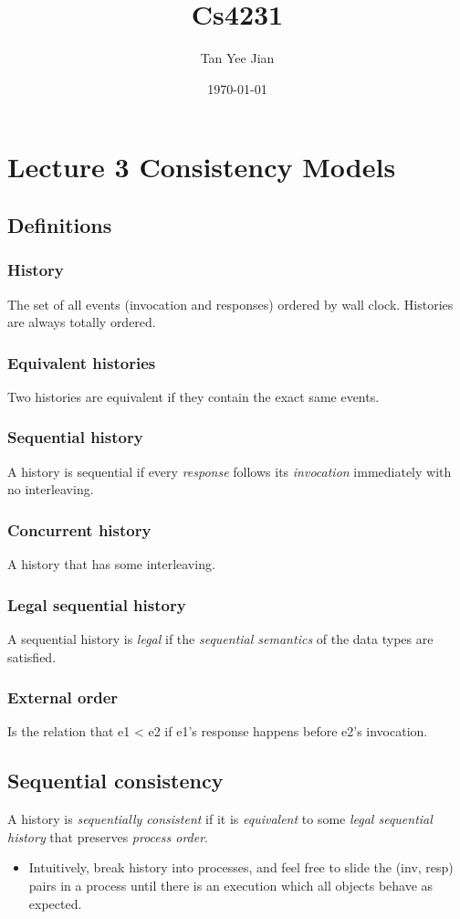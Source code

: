 \documentclass[11pt]{article}
\author{Tan Yee Jian}
\date{\today}
\title{Cs4231}
\begin{document}
\maketitle
\tableofcontents


\section{Lecture 3 Consistency Models}
\label{sec:org9940b0b}
\subsection{Definitions}
\label{sec:org087d1c8}
\subsubsection{History}
\label{sec:orgfaa4ba2}
The set of all events (invocation and responses) ordered by wall clock.
Histories are always totally ordered.
\subsubsection{Equivalent histories}
\label{sec:org9eecc41}
Two histories are equivalent if they contain the exact same events.
\subsubsection{Sequential history}
\label{sec:orgf49cfeb}
A history is sequential if every \emph{response} follows its \emph{invocation} immediately
with no interleaving.
\subsubsection{Concurrent history}
\label{sec:org4384562}
A history that has some interleaving.
\subsubsection{Legal sequential history}
\label{sec:org849178d}
A sequential history is \emph{legal} if the \emph{sequential semantics} of the data types
are satisfied.
\subsubsection{External order}
\label{sec:org0d807c1}
Is the relation that e1 < e2 if e1's response happens before e2's invocation.
\subsection{Sequential consistency}
\label{sec:org01a2e29}
A history is \emph{sequentially consistent} if it is \emph{equivalent} to some
\emph{legal sequential history} that preserves \emph{process order}.
\begin{itemize}
\item Intuitively, break history into processes, and feel free to slide the
(inv, resp) pairs in a process until there is an execution which all objects
behave as expected.
\end{itemize}
\end{document}
